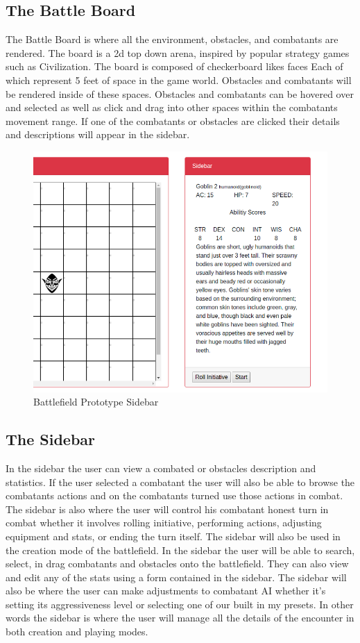 \documentclass[12pt,a4paper]{report}
\begin{document}
\subsection {The Battle Board }
The Battle Board is where all the environment, obstacles, and combatants are rendered. The board is a 2d top down arena, inspired by popular strategy games such as Civilization. The board is composed of checkerboard likes faces Each of which represent 5 feet of space in the game world. Obstacles and combatants will be rendered inside of these spaces. Obstacles and combatants can be hovered over and selected as well as click and drag into other spaces within the combatants movement range. If one of the combatants or obstacles are clicked their details and descriptions will appear in the sidebar. 
\begin{figure}[H]
	\centering
	\includegraphics[scale=.5]{encountercreatorsidebar}
	\caption{Battlefield Prototype Sidebar}
	\label{fig: Battlefield Prototype Sidebar}
\end{figure}
\subsection {The Sidebar }
In the sidebar the user can view a combated or obstacles description and statistics. If the user selected a combatant the user will also be able to browse the combatants actions and on the combatants turned use those actions in combat. The sidebar is also where the user will control his combatant honest turn in combat whether it involves rolling initiative, performing actions, adjusting equipment and stats, or ending the turn itself. The sidebar will also be used in the creation mode of the battlefield. In the sidebar the user will be able to search, select, in drag combatants and obstacles onto the battlefield. They can also view and edit any of the stats using a form contained in the sidebar. The sidebar will also be where the user can make adjustments to combatant AI whether it's setting its aggressiveness level or selecting one of our built in my presets. In other words the sidebar is where the user will manage all the details of the encounter in both creation and playing modes. 
\end{document}
